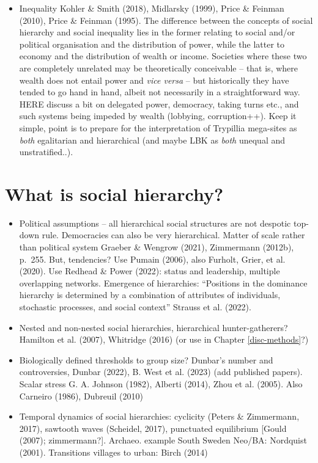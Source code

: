 \documentclass[
  12pt,
]{book}
\providecommand{\tightlist}{%
  \setlength{\itemsep}{0pt}\setlength{\parskip}{0pt}}
\begin{document}
\begin{itemize}
\tightlist
\item
  Inequality Kohler \& Smith (2018), Midlarsky (1999), Price \& Feinman (2010), Price \& Feinman (1995). The difference between the concepts of social hierarchy and social inequality lies in the former relating to social and/or political organisation and the distribution of power, while the latter to economy and the distribution of wealth or income. Societies where these two are completely unrelated may be theoretically conceivable -- that is, where wealth does not entail power and \emph{vice versa} -- but historically they have tended to go hand in hand, albeit not necessarily in a straightforward way. HERE discuss a bit on delegated power, democracy, taking turns etc., and such systems being impeded by wealth (lobbying, corruption++). Keep it simple, point is to prepare for the interpretation of Trypillia mega-sites as \emph{both} egalitarian and hierarchical (and maybe LBK as \emph{both} unequal and unstratified..).
\end{itemize}

\hypertarget{social-hierarchy}{%
\section{What is social hierarchy?}\label{social-hierarchy}}

\begin{itemize}
\item
  Political assumptions -- all hierarchical social structures are not despotic top-down rule. Democracies can also be very hierarchical. Matter of scale rather than political system Graeber \& Wengrow (2021), Zimmermann (2012b), p.~255. But, tendencies? Use Pumain (2006), also Furholt, Grier, et al. (2020). Use Redhead \& Power (2022): status and leadership, multiple overlapping networks. Emergence of hierarchies: ``Positions in the dominance hierarchy is determined by a combination of attributes of individuals, stochastic processes, and social context'' Strauss et al. (2022).
\item
  Nested and non-nested social hierarchies, hierarchical hunter-gatherers? Hamilton et al. (2007), Whitridge (2016) (or use in Chapter \ref{disc-methods}?)
\item
  Biologically defined thresholds to group size? Dunbar's number and controversies, Dunbar (2022), B. West et al. (2023) (add published papers). Scalar stress G. A. Johnson (1982), Alberti (2014), Zhou et al. (2005). Also Carneiro (1986), Dubreuil (2010)
\item
  Temporal dynamics of social hierarchies: cyclicity (Peters \& Zimmermann, 2017), sawtooth waves (Scheidel, 2017), punctuated equilibrium {[}Gould (2007); zimmermann?{]}. Archaeo. example South Sweden Neo/BA: Nordquist (2001). Transitions villages to urban: Birch (2014)
\end{itemize}
\end{document}
